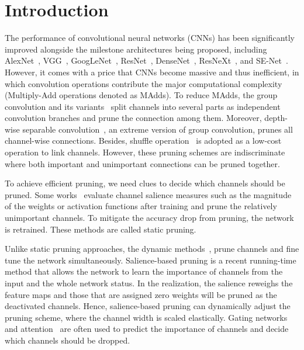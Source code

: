 \documentclass[lettersize,journal]{IEEEtran}
\begin{document}
\section{Introduction}
 The performance of convolutional neural networks (CNNs) has been significantly improved alongside the milestone architectures being proposed, including AlexNet~\cite{krizhevsky2012imagenet}, VGG~\cite{simonyan2014very}, GoogLeNet~\cite{szegedy2015going}, ResNet~\cite{he2016deep}, DenseNet~\cite{huang2017densely}, ResNeXt~\cite{xie2017aggregated}, and SE-Net~\cite{hu2018squeeze}. 
However, it comes with a price that CNNs become massive and thus inefficient, in which convolution operations contribute the major computational complexity (Multiply-Add operations denoted as MAdds). To reduce MAdds, the group convolution and its variants~\cite{huang2018condensenet, sun2018igcv3, xie2018interleaved, xie2017aggregated, zhang2017interleaved,wang2021spgnet} split channels into several parts as independent convolution branches and prune the connection among them. Moreover, depth-wise separable convolution~\cite{chollet2017xception,howard2017efficient,sandler2018inverted}, an extreme version of group convolution, prunes all channel-wise connections. Besides, shuffle operation~\cite{ma2018shufflenet, zhang2018shufflenet,liu2017learning,wen2016learning} is adopted as a low-cost operation to link channels. 
However, these pruning schemes are indiscriminate where both important and unimportant connections can be pruned together.



To achieve efficient pruning, we need clues to decide which channels should be pruned. 
Some works~\cite{li2016pruning,wen2016learning,liu2017learning,he2017channel,ye2018rethinking,liebenwein2019provable} evaluate channel salience measures such as the magnitude of the weights or activation functions after training and prune the relatively unimportant channels. To mitigate the accuracy drop from pruning, the network is retrained. These methods are called static pruning. 

Unlike static pruning approaches, the dynamic methods~\cite{chen2018gaternet,hua2018channel, lin2017runtime,bejnordi2019batch,chen2019self,gao2018dynamic,herrmann2018end,guo2020model,xia2021fully,su2020dynamic,bochkovskiy2020yolov4,tang2021manifold,li2021dynamic2,zhao2020efficient,ople2021adjustable,zhang2020accurate}, prune channels and fine tune the network simultaneously. Salience-based pruning is a recent running-time method that allows the network to learn the importance of channels from the input and the whole network status. In the realization, the salience reweighs the feature maps and those that are assigned zero weights will be pruned as the deactivated channels. Hence, salience-based pruning can dynamically adjust the pruning scheme, where the channel width is scaled elastically. Gating networks~\cite{chen2018gaternet,hua2018channel, lin2017runtime} and attention~\cite{bejnordi2019batch,chen2019self,gao2018dynamic,herrmann2018end,guo2020model,xia2021fully,su2020dynamic,bochkovskiy2020yolov4,tang2021manifold,li2021dynamic} are often used to predict the importance of channels and decide which channels should be dropped. 
\end{document}
